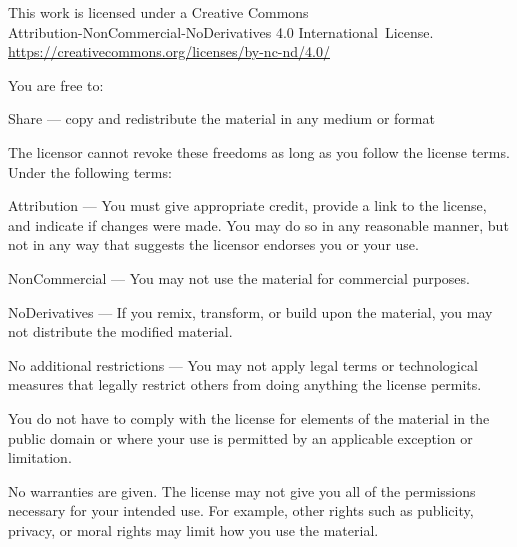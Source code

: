\clearpage
\thispagestyle{plain}

\ifhandbookedition
\vspace*{-2\onelineskip}
\fi

{%

\ifhandbookedition
\fontsize{8.5}{10}\selectfont%
\else
\fontsize{8.5}{10}\selectfont%
\fi

\setlength{\parindent}{0pt}%
\raggedright\label{copyright-details}%
\setlength{\parskip}{4.5pt}%

{\centering

{\fontsize{12}{12}\selectfont \ccbyncnd}

This work is licensed under a Creative Commons\\
Attribution-NonCommercial-NoDerivatives 4.0 International~License.\\
\href{https://creativecommons.org/licenses/by-nc-nd/4.0/}{https://creativecommons.org/licenses/by-nc-nd/4.0/}

}

You are free to:

\begin{packeditemize}
\item Share — copy and redistribute the material in any medium or format
\end{packeditemize}

The licensor cannot revoke these freedoms as long as you follow the license terms. Under the following terms:

\begin{packeditemize}
\item Attribution — You must give appropriate credit, provide a link to the license, and indicate if changes were made. You may do so in any reasonable manner, but not in any way that suggests the licensor endorses you or your use.
\item NonCommercial — You may not use the material for commercial purposes.
\item NoDerivatives — If you remix, transform, or build upon the material, you may not distribute the modified material.
\end{packeditemize}

No additional restrictions — You may not apply legal terms or technological measures that legally restrict others from doing anything the license permits.

You do not have to comply with the license for elements of the material in the public domain or where your use is permitted by an applicable exception or limitation.

No warranties are given. The license may not give you all of the permissions necessary for your intended use. For example, other rights such as publicity, privacy, or moral rights may limit how you use the material.

}
